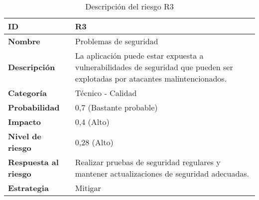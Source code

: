 \vspace{0.5cm}

\begin{table}[H]
	\centering
	\begin{tabular}{|l|m{12cm}|}
		\hline
		\textbf{ID}                  & R3                                                                                                                           \\
		\hline
		\textbf{Nombre}              & Problemas de seguridad                                                                                                       \\
		\hline
		\textbf{Descripción}         & La aplicación puede estar expuesta a vulnerabilidades de seguridad que pueden ser explotadas por atacantes malintencionados. \\
		\hline
		\textbf{Categoría}           & Técnico - Calidad                                                                                                            \\
		\hline
		\textbf{Probabilidad}        & 0,7 (Bastante probable)                                                                                                      \\
		\hline
		\textbf{Impacto}             & 0,4 (Alto)                                                                                                                   \\
		\hline
		\textbf{Nivel de riesgo}     & 0,28 (Alto)                                                                                                                  \\
		\hline
		\textbf{Respuesta al riesgo} & Realizar pruebas de seguridad regulares y mantener actualizaciones de seguridad adecuadas.                                   \\
		\hline
		\textbf{Estrategia}          & Mitigar                                                                                                                      \\
		\hline
	\end{tabular}
	\caption{Descripción del riesgo R3}
\end{table}

\vspace{0.5cm}


